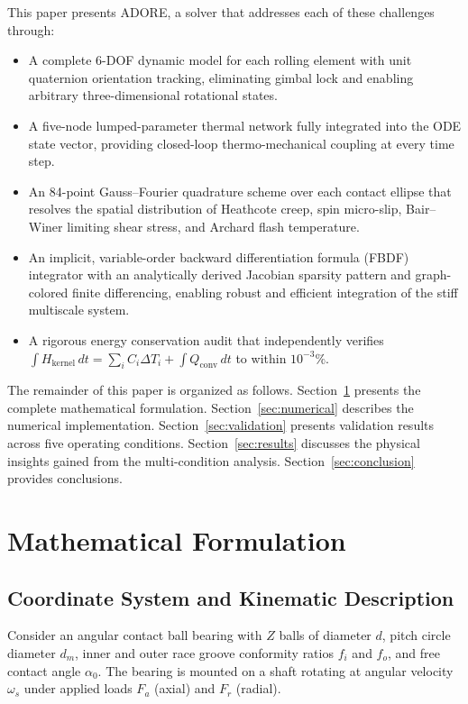 \documentclass[machines,article,submit,pdftex,moreauthors]{Definitions/mdpi}
\begin{document}
This paper presents ADORE, a solver that addresses each of these challenges through:
\begin{itemize}
    \item A complete 6-DOF dynamic model for each rolling element with unit quaternion orientation tracking, eliminating gimbal lock and enabling arbitrary three-dimensional rotational states.
    \item A five-node lumped-parameter thermal network fully integrated into the ODE state vector, providing closed-loop thermo-mechanical coupling at every time step.
    \item An 84-point Gauss--Fourier quadrature scheme over each contact ellipse that resolves the spatial distribution of Heathcote creep, spin micro-slip, Bair--Winer limiting shear stress, and Archard flash temperature.
    \item An implicit, variable-order backward differentiation formula (FBDF) integrator with an analytically derived Jacobian sparsity pattern and graph-colored finite differencing, enabling robust and efficient integration of the stiff multiscale system.
    \item A rigorous energy conservation audit that independently verifies $\int H_{\text{kernel}}\,dt = \sum_i C_i \Delta T_i + \int Q_{\text{conv}}\,dt$ to within $10^{-3}\%$.
\end{itemize}

The remainder of this paper is organized as follows. Section~\ref{sec:model} presents the complete mathematical formulation. Section~\ref{sec:numerical} describes the numerical implementation. Section~\ref{sec:validation} presents validation results across five operating conditions. Section~\ref{sec:results} discusses the physical insights gained from the multi-condition analysis. Section~\ref{sec:conclusion} provides conclusions.


\section{Mathematical Formulation}
\label{sec:model}

\subsection{Coordinate System and Kinematic Description}
\label{sec:kinematics}

Consider an angular contact ball bearing with $Z$ balls of diameter $d$, pitch circle diameter $d_m$, inner and outer race groove conformity ratios $f_i$ and $f_o$, and free contact angle $\alpha_0$. The bearing is mounted on a shaft rotating at angular velocity $\omega_s$ under applied loads $F_a$ (axial) and $F_r$ (radial).
\end{document}
